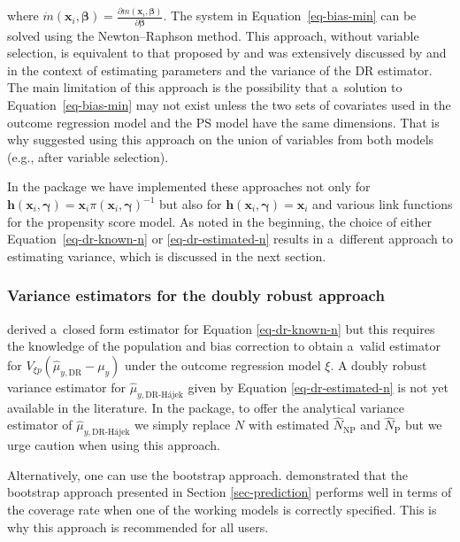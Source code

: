\documentclass[
]{jss}
\begin{document}
where
\(\dot{m}\left(\boldsymbol{x}_i, \boldsymbol{\beta}\right)=\frac{\partial m\left(\boldsymbol{x}_i, \boldsymbol{\beta}\right)}{\partial \boldsymbol{\beta}}\).
The system in Equation~\ref{eq-bias-min} can be solved using the
Newton--Raphson method. This approach, without variable selection, is
equivalent to that proposed by \citet{kim2014doubly} and was extensively
discussed by \citet{chen2020doubly} and \citet{wu2022statistical} in the
context of estimating parameters and the variance of the DR estimator.
The main limitation of this approach is the possibility that a~solution
to Equation~\ref{eq-bias-min} may not exist unless the two sets of
covariates used in the outcome regression model and the PS model have
the same dimensions. That is why \citet{yang_doubly_2020} suggested
using this approach on the union of variables from both models (e.g.,
after variable selection).

In the  package we have implemented these approaches not
only for
\(\boldsymbol{h}(\boldsymbol{x}_i, \boldsymbol{\gamma})=\boldsymbol{x}_i \pi\left(\boldsymbol{x}_i, \boldsymbol{\gamma}\right)^{-1}\)
but also for
\(\boldsymbol{h}(\boldsymbol{x}_i, \boldsymbol{\gamma})=\boldsymbol{x}_i\)
and various link functions for the propensity score model. As noted in
the beginning, the choice of either Equation~\ref{eq-dr-known-n} or
\ref{eq-dr-estimated-n} results in a~different approach to estimating
variance, which is discussed in the next section.

\subsubsection{Variance estimators for the doubly robust
approach}\label{variance-estimators-for-the-doubly-robust-approach}

\citet{yang_doubly_2020} derived a~closed form estimator for Equation
\ref{eq-dr-known-n} but this requires the knowledge of the population
and bias correction to obtain a~valid estimator for
\(V_{\xi p}\left(\hat{\mu}_{y,\text{DR}}-\mu_y\right)\) under the
outcome regression model \(\xi\). A doubly robust variance estimator for
\(\hat{\mu}_{y,\text{DR-H\'{a}jek}}\) given by Equation
\ref{eq-dr-estimated-n} is not yet available in the literature. In the
package, to offer the analytical variance estimator of
\(\hat{\mu}_{y,\text{DR-H\'{a}jek}}\) we simply replace \(N\) with
estimated \(\hat{N}_{\text{NP}}\) and \(\hat{N}_{\text{P}}\) but we urge
caution when using this approach.

Alternatively, one can use the bootstrap approach.
\citet{chen2020doubly} demonstrated that the bootstrap approach
presented in Section \ref{sec-prediction} performs well in terms of the
coverage rate when one of the working models is correctly specified.
This is why this approach is recommended for all users.
\end{document}
